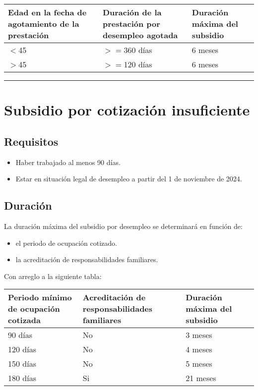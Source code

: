 \documentclass{article}
\begin{document}
	\begin{tabular}{|l|l|l|}
		\hline
		Edad en la fecha de agotamiento de la prestación & Duración de la prestación por desempleo agotada & Duración máxima del subsidio \\
		\hline
		$<$45 & $>=$360 días & 6 meses \\
		\hline
		$>$45 & $>=$120 días & 6 meses \\
		\hline
	\end{tabular}
	
	\bigskip
	
	\hrule
	
	\section*{Subsidio por cotización insuficiente}
	
	\subsection*{Requisitos}
	
	\begin{itemize}
		\item Haber trabajado al menos 90 días.
		\item Estar en situación legal de desempleo a partir del 1 de noviembre de 2024.
	\end{itemize}
	
	\subsection*{Duración}
	
	La duración máxima del subsidio por desempleo se determinará en función de:
	
	\begin{itemize}
		\item el periodo de ocupación cotizado.
		\item la acreditación de responsabilidades familiares.
	\end{itemize}
	
	Con arreglo a la siguiente tabla:
	
	\begin{tabular}{|l|l|l|l|}
		\hline
		Periodo mínimo de ocupación cotizada & Acreditación de responsabilidades familiares & Duración máxima del subsidio \\
		\hline
		90 días & No & 3 meses \\
		\hline
		120 días & No & 4 meses \\
		\hline
		150 días & No & 5 meses \\
		\hline
		180 días & Si & 21 meses \\
		\hline
	\end{tabular}
	
\end{document}
